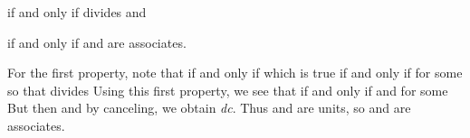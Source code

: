 \documentclass[11pt,oneside]{article}
\begin{document}
\begin{BookBody}
 if and only if  divides  and

 if and only if  and  are associates.

\noindent For the first property, note that  if and only if  which is true if and only if  for some  so that  divides  Using this first property, we see that  if and only if  and  for some  But then  and by canceling, we obtain  \textit{dc}. Thus  and  are units, so  and  are associates.

\end{BookBody}

\BookNarrativetrue
\end{document}
